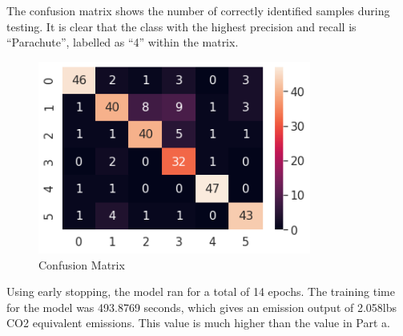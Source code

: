 The confusion matrix shows the number of correctly identified samples during
testing. It is clear that the class with the highest precision and recall is
``Parachute'', labelled as ``4'' within the matrix.

\begin{figure}[H]
	\centering
	\includegraphics[width=0.8\textwidth]{images/q1/pb/matrix}
	\caption{Confusion Matrix}
	\label{fig:q1pbMatrix}
\end{figure}

Using early stopping, the model ran for a total of 14 epochs. The training time
for the model was 493.8769 seconds, which gives an emission output of 2.058lbs
CO2 equivalent emissions. This value is much higher than the value in Part a.
